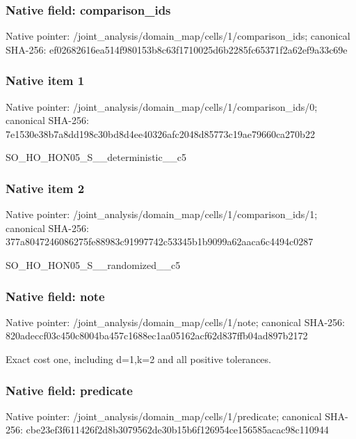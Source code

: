 \documentclass[10pt,a4paper]{article}
\begin{document}
\subsubsection{Native field: comparison\_\allowbreak{}ids}
Native pointer: /joint\_\allowbreak{}analysis/domain\_\allowbreak{}map/cells/1/comparison\_\allowbreak{}ids; canonical SHA-256: ef02682616ea514f980153b8c63f1710025d6b2285fc65371f2a62ef9a33c69e

\subsubsection{Native item 1}
Native pointer: /joint\_\allowbreak{}analysis/domain\_\allowbreak{}map/cells/1/comparison\_\allowbreak{}ids/0; canonical SHA-256: 7e1530e38b7a8dd198c30bd8d4ee40326afc2048d85773c19ae79660ca270b22

\begingroup\raggedright\sloppy SO\_\allowbreak{}HO\_\allowbreak{}HON05\_\allowbreak{}S\_\allowbreak{}\_\allowbreak{}deterministic\_\allowbreak{}\_\allowbreak{}c5\par\endgroup

\subsubsection{Native item 2}
Native pointer: /joint\_\allowbreak{}analysis/domain\_\allowbreak{}map/cells/1/comparison\_\allowbreak{}ids/1; canonical SHA-256: 377a8047246086275fe88983c91997742c53345b1b9099a62aaca6c4494c0287

\begingroup\raggedright\sloppy SO\_\allowbreak{}HO\_\allowbreak{}HON05\_\allowbreak{}S\_\allowbreak{}\_\allowbreak{}randomized\_\allowbreak{}\_\allowbreak{}c5\par\endgroup

\subsubsection{Native field: note}
Native pointer: /joint\_\allowbreak{}analysis/domain\_\allowbreak{}map/cells/1/note; canonical SHA-256: 820adeccf03c450c8004ba457c1688ec1aa05162acf62d837ffb04ad897b2172

\begingroup\raggedright\sloppy Exact cost one,\allowbreak{} including d=\allowbreak{}1,\allowbreak{}k=\allowbreak{}2 and all positive tolerances.\par\endgroup

\subsubsection{Native field: predicate}
Native pointer: /joint\_\allowbreak{}analysis/domain\_\allowbreak{}map/cells/1/predicate; canonical SHA-256: cbe23ef3f611426f2d8b3079562de30b15b6f126954ce156585acac98c110944
\end{document}
